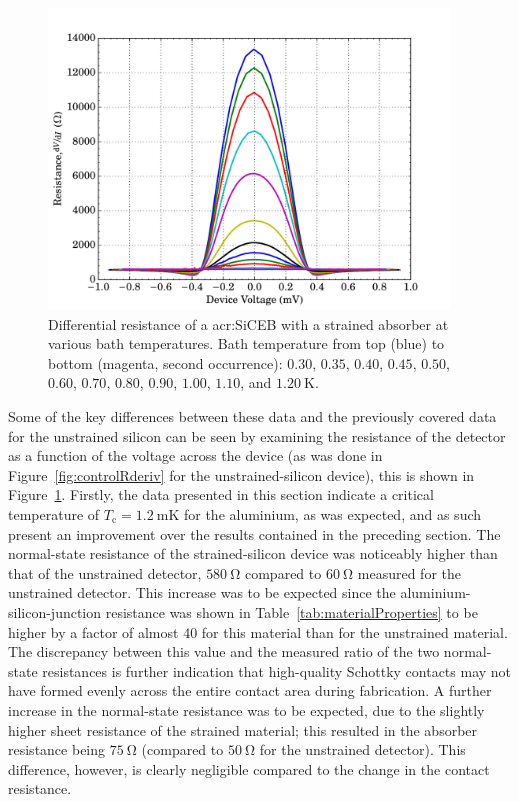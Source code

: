 \par 
\begin{figure}[tb]
\begin{center}
\includegraphics[width = 0.95\textwidth]{figures/strained_Rderiv}
\caption[Differential resistance of a \gls{acr:SiCEB} with a strained absorber]{Differential resistance of a \gls{acr:SiCEB} with a strained absorber at various bath temperatures. Bath temperature from top (blue) to bottom (magenta, second occurrence): $0.30$, $0.35$, $0.40$, $0.45$, $0.50$, $0.60$, $0.70$, $0.80$, $0.90$, $1.00$, $1.10$, and $1.20~\mathrm{K}$.}
\label{fig:strainedRderiv}
\end{center}
\end{figure}
Some of the key differences between these data and the previously covered data for the unstrained silicon can be seen by examining the resistance of the detector as a function of the voltage across the device (as was done in Figure~\ref{fig:controlRderiv} for the unstrained-silicon device), this is shown in Figure~\ref{fig:strainedRderiv}. Firstly, the data presented in this section indicate a critical temperature of $T_{\mathrm{c}} = 1.2~\mathrm{mK}$ for the aluminium, as was expected, and as such present an improvement over the results contained in the preceding section. The normal-state resistance of the strained-silicon device was noticeably higher than that of the unstrained detector, $580~\mathrm{\Omega}$ compared to $60~\mathrm{\Omega}$ measured for the unstrained detector. This increase was to be expected since the aluminium-silicon-junction resistance was shown in Table~\ref{tab:materialProperties} to be higher by a factor of almost $40$ for this material than for the unstrained material. The discrepancy between this value and the measured ratio of the two normal-state resistances is further indication that high-quality Schottky contacts may not have formed evenly across the entire contact area during fabrication. A further increase in the normal-state resistance was to be expected, due to the slightly higher sheet resistance of the strained material; this resulted in the absorber resistance being $75~\mathrm{\Omega}$ (compared to $50~\mathrm{\Omega}$ for the unstrained detector). This difference, however, is clearly negligible compared to the change in the contact resistance.
